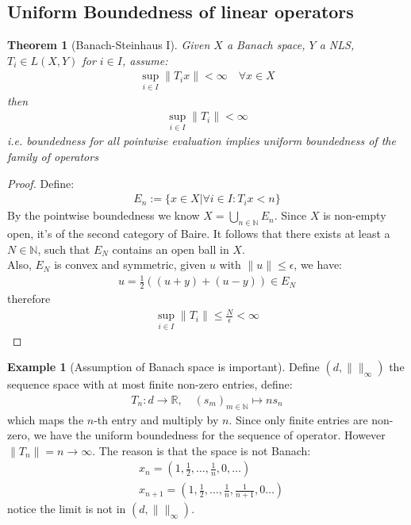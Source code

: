 \documentclass[a4paper,11pt,fleqn]{book}
\newtheorem{theorem}{Theorem}[section]
\theoremstyle{definition}
\newtheorem*{example}{Example}
\theoremstyle{remark}
\begin{document}
\subsection{Uniform Boundedness of linear operators}
\begin{theorem}[Banach-Steinhaus I]
	Given $X$ a Banach space, $Y$ a NLS, $T_i \in L(X, Y)$ for $i \in I$, assume:
	\begin{align*}
		\sup_{i \in I} \|T_i x\| < \infty \quad \forall x \in X
	\end{align*}
	then
	\begin{align*}
		\sup_{ i \in I} \|T_i\| < \infty
	\end{align*}
	i.e. boundedness for all pointwise evaluation implies uniform boundedness of the family of operators
\end{theorem}
\begin{proof}
Define:
\begin{align*}
	E_n:= \{x \in X| \forall i \in I: T_i x < n \} 
\end{align*}
By the pointwise boundedness we know $X = \bigcup_{n \in \mathbb{N}} E_n$. Since $X$ is non-empty open, it's of the second category of Baire. It follows that there exists at least a $N \in \mathbb{N}$, such that $E_N$ contains an open ball in $X$.\\
Also, $E_N$ is convex and symmetric, given $u$ with $\|u\| \le \epsilon$, we have:
\begin{align*}
	u= \frac{1}{2}( (u + y) + (u - y)) \in E_N
\end{align*}
therefore
\begin{align*}
	\sup_{i \in I} \|T_i\|   \le  \frac{N}{\epsilon} < \infty
\end{align*}
\end{proof}

\begin{example}[Assumption of Banach space is important]
Define $(d, \|\|_\infty)$ the sequence space with at most finite non-zero entries, define:
\begin{align*}
	T_n: d \rightarrow \mathbb{R},\quad (s_m)_{m \in \mathbb{N}} \mapsto ns_n
\end{align*}
which maps the $n$-th entry and multiply by $n$. Since only finite entries are non-zero, we have the uniform boundedness for the sequence of operator. However $\|T_n\| = n \rightarrow \infty$. The reason is that the space is not Banach: 
\begin{align*}
	&x_n = (1, \frac{1}{2}, \dots, \frac{1}{n}, 0, \dots)\\
	&x_{n+1} = (1, \frac{1}{2}, \dots, \frac{1}{n}, \frac{1}{n+1}, 0\dots)
\end{align*} 
notice the limit is not in $(d, \|\|_\infty)$.
\end{example}
\end{document}
